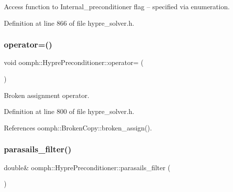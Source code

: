Access function to Internal\+\_\+preconditioner flag -- specified via enumeration. 



Definition at line 866 of file hypre\+\_\+solver.\+h.

\mbox{\label{classoomph_1_1HyprePreconditioner_ae5ca775c231584c86193d2219a9c452a}} 
\subsubsection{\texorpdfstring{operator=()}{operator=()}}
{\footnotesize\ttfamily void oomph\+::\+Hypre\+Preconditioner\+::operator= (\begin{DoxyParamCaption}\item[{const \hyperlink{classoomph_1_1HyprePreconditioner}{Hypre\+Preconditioner} \&}]{ }\end{DoxyParamCaption})\hspace{0.3cm}{\ttfamily [inline]}}



Broken assignment operator. 



Definition at line 800 of file hypre\+\_\+solver.\+h.



References oomph\+::\+Broken\+Copy\+::broken\+\_\+assign().

\mbox{\label{classoomph_1_1HyprePreconditioner_af7781e6421b33a38a2b473190d26df70}} 
\subsubsection{\texorpdfstring{parasails\+\_\+filter()}{parasails\_filter()}}
{\footnotesize\ttfamily double\& oomph\+::\+Hypre\+Preconditioner\+::parasails\+\_\+filter (\begin{DoxyParamCaption}{ }\end{DoxyParamCaption})\hspace{0.3cm}{\ttfamily [inline]}}



